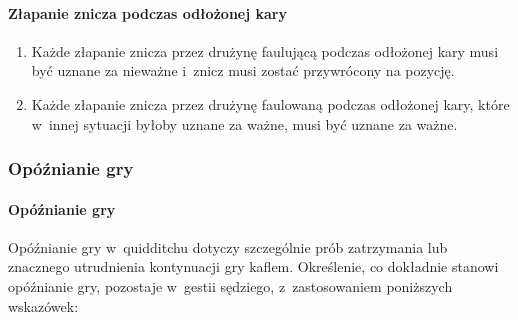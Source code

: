 \documentclass[12pt,a4paper]{article}
\begin{document}
\paragraph{Złapanie znicza podczas odłożonej kary}

\begin{enumerate}
	\item
	      Każde złapanie znicza przez drużynę faulującą podczas odłożonej kary
	      musi być uznane za nieważne i~znicz musi zostać przywrócony na pozycję.
	\item
	      Każde złapanie znicza przez drużynę faulowaną podczas odłożonej kary,
	      które w~innej sytuacji byłoby uznane za ważne, musi być uznane za ważne.
\end{enumerate}

\subsubsection{Opóźnianie gry}

\paragraph{Opóźnianie gry}
Opóźnianie gry w~quidditchu dotyczy
szczególnie prób zatrzymania lub znacznego utrudnienia kontynuacji gry
kaflem. Określenie, co dokładnie stanowi opóźnianie gry, pozostaje w~gestii sędziego, z~zastosowaniem poniższych wskazówek:
\end{document}
